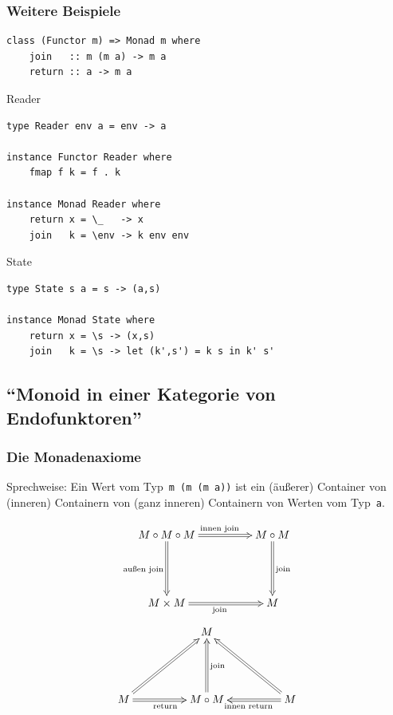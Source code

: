 \documentclass[12pt,compress,ngerman,utf8,t]{beamer}
\begin{document}
\begin{frame}[fragile]\frametitle{Weitere Beispiele}
  \begin{verbatim}
class (Functor m) => Monad m where
    join   :: m (m a) -> m a
    return :: a -> m a
  \end{verbatim}

  \begin{block}{Reader}
    \scriptsize
    \begin{verbatim}
type Reader env a = env -> a

instance Functor Reader where
    fmap f k = f . k

instance Monad Reader where
    return x = \_   -> x
    join   k = \env -> k env env
    \end{verbatim}
  \end{block}

  \begin{block}{State}
    \scriptsize
    \begin{verbatim}
type State s a = s -> (a,s)

instance Monad State where
    return x = \s -> (x,s)
    join   k = \s -> let (k',s') = k s in k' s'
    \end{verbatim}
  \end{block}
\end{frame}


\subsection{"`Monoid in einer Kategorie von Endofunktoren"'}

\begin{frame}\frametitle{Die Monadenaxiome}
  {\scriptsize
  Sprechweise: Ein Wert vom Typ~\texttt{m (m (m a))} ist ein (äußerer) Container von
  (inneren) Containern von (ganz inneren) Containern von Werten vom
  Typ~\texttt{a}.\par}

  \[ \xymatrixcolsep{4pc}\xymatrixrowsep{4pc}\xymatrix{
    M \circ M \circ M \ar@{=>}[r]^{\text{innen join}} \ar@{=>}[d]_{\text{außen join}} & M \circ M
    \ar@{=>}[d]^{\text{join}} \\
    M \times M \ar@{=>}[r]_{\text{join}} & M
  } \]
  \medskip
  \[ \xymatrixcolsep{4pc}\xymatrixrowsep{4pc}\xymatrix{
    & M \\
    M \ar@{=>}[r]_{\text{return}}\ar@{=>}[ru] & M \circ M \ar@{=>}[u]_{\text{join}} & \ar@{=>}[l]^{\text{innen
    return}}\ar@{=>}[lu] M
  } \]
\end{frame}
\end{document}

